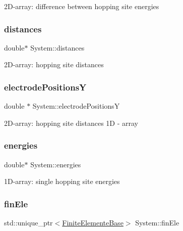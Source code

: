 2\+D-\/array\+: difference between hopping site energies \mbox{\label{classSystem_a682a961342b2200c748da544fb84488a}} 
\subsubsection{\texorpdfstring{distances}{distances}}
{\footnotesize\ttfamily double$\ast$ System\+::distances\hspace{0.3cm}{\ttfamily [private]}}

2\+D-\/array\+: hopping site distances \mbox{\label{classSystem_a19886677a5c1f1989fee3a9d1d4b4c80}} 
\subsubsection{\texorpdfstring{electrode\+PositionsY}{electrodePositionsY}}
{\footnotesize\ttfamily double $\ast$ System\+::electrode\+PositionsY\hspace{0.3cm}{\ttfamily [private]}}

2\+D-\/array\+: hopping site distances 1D -\/ array \mbox{\label{classSystem_aee5f3f70dcfa30875997d09e2a077dce}} 
\subsubsection{\texorpdfstring{energies}{energies}}
{\footnotesize\ttfamily double$\ast$ System\+::energies\hspace{0.3cm}{\ttfamily [private]}}

1\+D-\/array\+: single hopping site energies \mbox{\label{classSystem_a586a959bbcb019f061535e63d7a96852}} 
\subsubsection{\texorpdfstring{fin\+Ele}{finEle}}
{\footnotesize\ttfamily std\+::unique\+\_\+ptr$<$\hyperlink{classFiniteElementeBase}{Finite\+Elemente\+Base}$>$ System\+::fin\+Ele\hspace{0.3cm}{\ttfamily [private]}}

